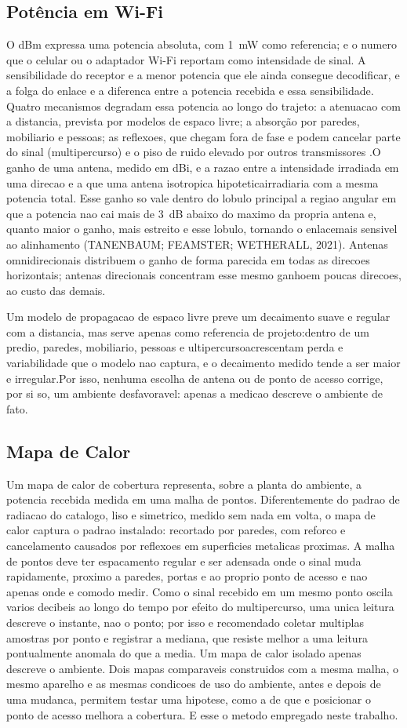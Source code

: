 \subsection{Potência em Wi-Fi}
O dBm expressa uma potencia absoluta, com 1~mW como referencia; e o numero que o celular ou o adaptador Wi-Fi reportam como intensidade de sinal. A sensibilidade do receptor e a menor potencia que ele ainda consegue decodificar, e a folga do enlace e a diferenca entre a potencia recebida e essa sensibilidade. Quatro mecanismos degradam essa potencia ao longo do trajeto: a atenuacao com a distancia, prevista por modelos de espaco livre; a absorção por paredes, mobiliario e pessoas; as reflexoes, que chegam fora de fase e podem cancelar parte do sinal (multipercurso) e o piso de ruido elevado por outros transmissores .O ganho de uma antena, medido em dBi, e a razao entre a intensidade irradiada em uma direcao e a que uma antena isotropica hipoteticairradiaria com a mesma potencia total. Esse ganho so vale dentro do lobulo principal a regiao angular em que a potencia nao cai mais de 3~dB abaixo do maximo da propria antena e, quanto maior o ganho, mais estreito e esse lobulo, tornando o enlacemais sensivel ao alinhamento (TANENBAUM; FEAMSTER; WETHERALL, 2021). Antenas omnidirecionais distribuem o ganho de forma parecida em todas as
direcoes horizontais; antenas direcionais concentram esse mesmo ganhoem poucas direcoes, ao custo das demais.

Um modelo de propagacao de espaco livre preve um decaimento suave e regular com a distancia, mas serve apenas como referencia de projeto:dentro de um predio, paredes, mobiliario, pessoas e ultipercursoacrescentam perda e variabilidade que o modelo nao captura, e o decaimento medido tende a ser maior e irregular.Por isso, nenhuma escolha de antena ou de ponto de acesso corrige, por si so, um ambiente desfavoravel: apenas a medicao descreve o ambiente
de fato.
\subsection{Mapa de Calor}
\label{subsec:heatMap}
Um mapa de calor de cobertura representa, sobre a planta do ambiente, a potencia recebida medida em uma malha de pontos. Diferentemente do padrao de radiacao do catalogo, liso e simetrico, medido sem nada em volta, o mapa de calor captura o padrao instalado: recortado por paredes, com reforco e cancelamento causados por reflexoes em superficies metalicas proximas. A malha de pontos deve ter espacamento regular e ser adensada onde o sinal muda rapidamente, proximo a paredes, portas e ao proprio ponto de acesso e nao apenas onde e comodo medir. Como o sinal recebido em um mesmo ponto oscila varios decibeis ao longo do tempo por efeito do multipercurso, uma unica leitura descreve o instante, nao o ponto; por isso e recomendado coletar multiplas amostras por ponto e registrar a mediana, que resiste melhor a uma leitura pontualmente anomala do que a media. Um mapa de calor isolado apenas descreve o ambiente. Dois mapas comparaveis construidos com a mesma malha, o mesmo aparelho e as mesmas condicoes de uso do ambiente, antes e depois de uma mudanca, permitem testar uma hipotese, como a de que e posicionar o ponto de acesso melhora a cobertura. E esse o metodo empregado neste trabalho.